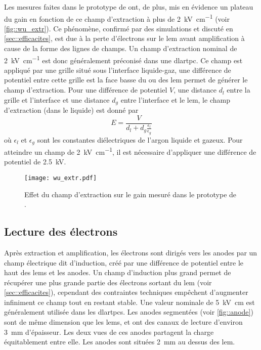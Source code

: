       Les mesures faites dans le prototype de \threeL{} ont, de plus, mis en évidence un plateau du gain en fonction de ce champ d'extraction à plus de \SI{2}{\kilo\volt\per\centi\meter} (voir \autoref{fig::wu_extr}). Ce phénomène, confirmé par des simulations et discuté en \autoref{sec::efficacites}, est due à la perte d'électrons sur le \gls{lem} avant amplification à cause de la forme des lignes de champs. Un champ d'extraction nominal de \SI{2}{\kilo\volt\per\centi\meter} est donc généralement préconisé dans une \gls{dlartpc}. Ce champ est appliqué par une grille situé sous l'interface liquide-gaz, une différence de potentiel entre cette grille est la face basse du ou des \gls{lem} permet de générer le champ d'extraction. Pour une différence de potentiel $V$, une distance $d_l$ entre la grille et l'interface et une distance $d_g$ entre l'interface et le \gls{lem}, le champ d'extraction (dans le liquide) est donné par
      \begin{equation}
        E = \frac{V}{d_l + d_g\frac{\epsilon_l}{\epsilon_g}}
      \end{equation}
      où $\epsilon_l$ et $\epsilon_g$ sont les constantes diélectriques de l'argon liquide et gazeux. Pour atteindre un champ de \SI{2}{\kilo\volt\per\centi\meter}, il est nécessaire d'appliquer une différence de potentiel de \SI{2.5}{\kilo\volt}.

      \begin{figure}[htbp]
        \centering
        \texttt{[image: wu\_extr.pdf]}
        \caption[Effet du champ d'extraction sur le gain mesuré dans le prototype de \threeL{}.]{\label{fig::wu_extr}Effet du champ d'extraction sur le gain mesuré dans le prototype de \threeL{}\cite{Wu2017}.}
      \end{figure}

    \subsection{Lecture des électrons}\label{sec::induction}
    
      Après extraction et amplification, les électrons sont dirigés vers les anodes par un champ électrique dit d'induction, créé par une différence de potentiel entre le haut des \glspl{lem} et les anodes. Un champ d'induction plus grand permet de récupérer une plus grande partie des électrons sortant du \gls{lem} (voir \autoref{sec::efficacites}), cependant des contraintes techniques empêchent d'augmenter infiniment ce champ tout en restant stable. Une valeur nominale de \SI{5}{\kilo\volt\centi\meter} est généralement utilisée dans les \glspl{dlartpc}. Les anodes segmentées (voir \autoref{fig::anode}) sont de même dimension que les \glspl{lem}, et ont des canaux de lecture d'environ \SI{3}{\milli\meter} d'épaisseur. Les deux vues de ces anodes partagent la charge équitablement entre elle. Les anodes sont situées \SI{2}{\milli\meter} au dessus des \gls{lem}.

